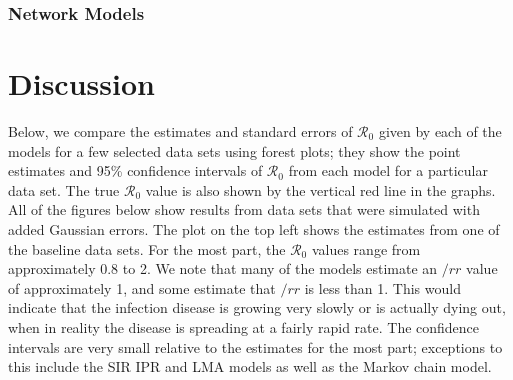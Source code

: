 \documentclass[12pt]{article}
\newcommand{\rr}{\ensuremath{\mathcal{R}_0}}
\begin{document}

\subsubsection{Network Models}



\section{Discussion}
\label{sec:dis}

Below, we compare the estimates and standard errors of $\rr$ given by each of the models for a few selected data sets using forest plots; they show the point estimates and 95\% confidence intervals of $\rr$ from each model for a particular data set. The true $\rr$ value is also shown by the vertical red line in the graphs. All of the figures below show results from data sets that were simulated with added Gaussian errors. The plot on the top left shows the estimates from one of the baseline data sets. For the most part, the $\rr$ values range from approximately 0.8 to 2. We note that many of the models estimate an $/rr$ value of approximately 1, and some estimate that $/rr$ is less than 1. This would indicate that the infection disease is growing very slowly or is actually dying out, when in reality the disease is spreading at a fairly rapid rate. The confidence intervals are very small relative to the estimates for the most part; exceptions to this include the SIR IPR and LMA models as well as the Markov chain model. 
\end{document}
